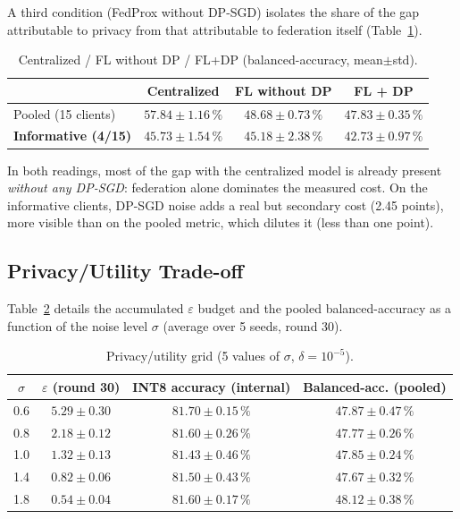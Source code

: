 \documentclass{acmart}
\begin{document}
A third condition (FedProx without DP-SGD) isolates the share of the gap
attributable to privacy from that attributable to federation itself
(Table~\ref{tab:decomp}).

\begin{table}[h!]
\centering
\small
\caption{Centralized / FL without DP / FL+DP (balanced-accuracy, mean$\pm$std).}
\label{tab:decomp}
\begin{tabular}{lccc}
\toprule
 & Centralized & FL without DP & FL + DP \\
\midrule
Pooled (15 clients)       & $57.84\pm1.16\,\%$ & $48.68\pm0.73\,\%$ & $47.83\pm0.35\,\%$ \\
\textbf{Informative (4/15)} & $\mathbf{45.73\pm1.54\,\%}$ & $\mathbf{45.18\pm2.38\,\%}$ & $\mathbf{42.73\pm0.97\,\%}$ \\
\bottomrule
\end{tabular}
\end{table}

In both readings, most of the gap with the centralized model is already present
\emph{without any DP-SGD}: federation alone dominates the measured cost. On the
informative clients, DP-SGD noise adds a real but secondary cost (2.45 points), more
visible than on the pooled metric, which dilutes it (less than one point).

\subsection{Privacy/Utility Trade-off}

Table~\ref{tab:eps} details the accumulated $\varepsilon$ budget and the pooled
balanced-accuracy as a function of the noise level $\sigma$ (average over 5 seeds,
round 30).

\begin{table}[h!]
\centering
\small
\caption{Privacy/utility grid (5 values of $\sigma$, $\delta=10^{-5}$).}
\label{tab:eps}
\begin{tabular}{cccc}
\toprule
$\sigma$ & $\varepsilon$ (round 30) & INT8 accuracy (internal) & Balanced-acc. (pooled) \\
\midrule
0.6 & $5.29\pm0.30$ & $81.70\pm0.15\,\%$ & $47.87\pm0.47\,\%$ \\
0.8 & $2.18\pm0.12$ & $81.60\pm0.26\,\%$ & $47.77\pm0.26\,\%$ \\
1.0 & $1.32\pm0.13$ & $81.43\pm0.46\,\%$ & $47.85\pm0.24\,\%$ \\
1.4 & $0.82\pm0.06$ & $81.50\pm0.43\,\%$ & $47.67\pm0.32\,\%$ \\
1.8 & $0.54\pm0.04$ & $81.60\pm0.17\,\%$ & $48.12\pm0.38\,\%$ \\
\bottomrule
\end{tabular}
\end{table}
\end{document}
